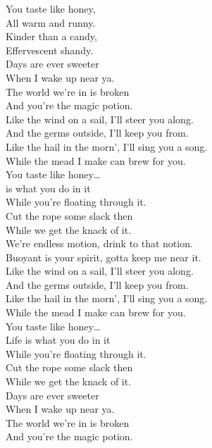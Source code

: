 



You taste like honey, \\
All warm and runny. \\
Kinder than a candy, \\
Effervescent shandy. \\
Days are ever sweeter \\
When I wake up near ya. \\
The world we're in is broken \\
And you're the magic potion. \\

Like the wind on a sail, I'll steer you along. \\
And the germs outside, I'll keep you from. \\
Like the hail in the morn', I'll sing you a song. \\
While the mead I make can brew for you. \\

You taste like honey… \\

 is what you do in it \\
While you're floating through it. \\
Cut the rope some slack then \\
While we get the knack of it. \\
We're endless motion, drink to that notion. \\
Buoyant is your spirit, gotta keep me near it. \\

Like the wind on a sail, I'll steer you along. \\
And the germs outside, I'll keep you from. \\
Like the hail in the morn', I'll sing you a song. \\
While the mead I make can brew for you. \\

You taste like honey… \\

Life is what you do in it \\
While you're floating through it. \\
Cut the rope some slack then \\
While we get the knack of it. \\
Days are ever sweeter \\
When I wake up near ya. \\
The world we're in is broken \\
And you're the magic potion. \\

